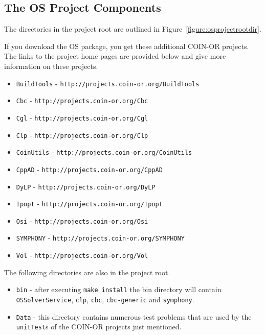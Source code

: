 \documentclass[11pt]{article}
\newcounter{Fig}
\renewcommand{\_}{{\char"5F}}
\renewcommand{\{}{{\char"7B}}
\renewcommand{\}}{{\char"7D}}
\renewcommand{\^}{{\char"0D}}
\renewcommand{\'}{{\char"0D}}
\newcommand{\UrlBuildtools}{http://projects.coin-or.org/BuildTools}
\newcommand{\UrlCbc}{http://projects.coin-or.org/Cbc}
\newcommand{\UrlCgl}{http://projects.coin-or.org/Cgl}
\newcommand{\UrlClp}{http://projects.coin-or.org/Clp}
\newcommand{\UrlCoinUtils}{http://projects.coin-or.org/CoinUtils}
\newcommand{\UrlCppad}{http://projects.coin-or.org/CppAD}
\newcommand{\UrlDylp}{http://projects.coin-or.org/DyLP}
\newcommand{\UrlIpopt}{http://projects.coin-or.org/Ipopt}
\newcommand{\UrlOsi}{http://projects.coin-or.org/Osi}
\newcommand{\UrlSymphony}{http://projects.coin-or.org/SYMPHONY}
\newcommand{\UrlVol}{http://projects.coin-or.org/Vol}
\begin{document}
\begin{enumerate}[Step 1:]
\section{The OS Project Components}\label{section:projectcomponents}

The directories in the  project root  are outlined in Figure~\ref{figure:osprojectrootdir}.

If you download the OS package, you get these additional COIN-OR projects. The links to the project home pages are provided below and give more information on these projects.
\begin{itemize}
\item {\tt BuildTools} - {\tt\UrlBuildtools}
\item {\tt Cbc} - {\tt\UrlCbc}
\item {\tt Cgl} - {\tt\UrlCgl}
\item {\tt Clp} - {\tt\UrlClp}
\item {\tt CoinUtils} - {\tt\UrlCoinUtils}
\item {\tt CppAD} - {\tt\UrlCppad}
\item {\tt DyLP}  - {\tt\UrlDylp}
\item {\tt Ipopt} - {\tt\UrlIpopt}
\item {\tt Osi} - {\tt\UrlOsi}
\item {\tt SYMPHONY}   - {\tt\UrlSymphony}
\item {\tt Vol} - {\tt\UrlVol}
\end{itemize}

The following directories are also in the project root.
\begin{itemize}
\item {\tt bin} - after executing {\tt make install} the bin directory will contain 
{\tt OSSolverService}, {\tt clp}, {\tt cbc},  
{\tt cbc-generic} and {\tt symphony}.

\item {\tt Data} - this directory contains numerous test problems that are used by the {\tt unitTest}s of
the COIN-OR projects just mentioned.


\end{itemize}
\end{enumerate}
\end{document}
